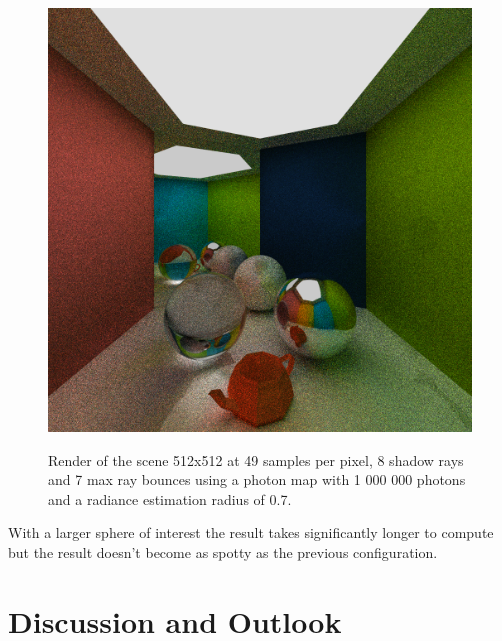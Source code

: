 \documentclass[a4paper, twocolumn]{article}
\begin{document}
             \begin{figure}[H]
                \centering
                \caption{Render of the scene 512x512 at 49 samples per pixel, 8 shadow rays and 7 max ray bounces using a photon map with 1 000 000 photons and a radiance estimation radius of 0.7.}
                \includegraphics[width=0.8\linewidth]{share/results/photons_0_7.png}
                \label{fig:photons_0_7}
            \end{figure}

            With a larger sphere of interest the result takes significantly longer to compute but the result doesn't become as spotty as the previous configuration.

    \section{Discussion and Outlook} \label{sec:discussion_and_outlook}

    \newpage %
    \nocite{*} %
    
    
\end{document}
